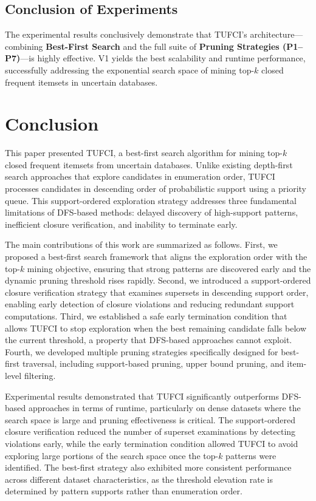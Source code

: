 \documentclass[10pt,letterpaper]{article}
\begin{document}
\subsection*{Conclusion of Experiments}
The experimental results conclusively demonstrate that TUFCI's architecture—combining \textbf{Best-First Search} and the full suite of \textbf{Pruning Strategies (P1--P7)}—is highly effective. V1 yields the best scalability and runtime performance, successfully addressing the exponential search space of mining top-$k$ closed frequent itemsets in uncertain databases.

\section*{Conclusion}

This paper presented TUFCI, a best-first search algorithm for mining top-$k$ closed frequent itemsets from uncertain databases. Unlike existing depth-first search approaches that explore candidates in enumeration order, TUFCI processes candidates in descending order of probabilistic support using a priority queue. This support-ordered exploration strategy addresses three fundamental limitations of DFS-based methods: delayed discovery of high-support patterns, inefficient closure verification, and inability to terminate early.

The main contributions of this work are summarized as follows. First, we proposed a best-first search framework that aligns the exploration order with the top-$k$ mining objective, ensuring that strong patterns are discovered early and the dynamic pruning threshold rises rapidly. Second, we introduced a support-ordered closure verification strategy that examines supersets in descending support order, enabling early detection of closure violations and reducing redundant support computations. Third, we established a safe early termination condition that allows TUFCI to stop exploration when the best remaining candidate falls below the current threshold, a property that DFS-based approaches cannot exploit. Fourth, we developed multiple pruning strategies specifically designed for best-first traversal, including support-based pruning, upper bound pruning, and item-level filtering.

Experimental results demonstrated that TUFCI significantly outperforms DFS-based approaches in terms of runtime, particularly on dense datasets where the search space is large and pruning effectiveness is critical. The support-ordered closure verification reduced the number of superset examinations by detecting violations early, while the early termination condition allowed TUFCI to avoid exploring large portions of the search space once the top-$k$ patterns were identified. The best-first strategy also exhibited more consistent performance across different dataset characteristics, as the threshold elevation rate is determined by pattern supports rather than enumeration order.
\end{document}
